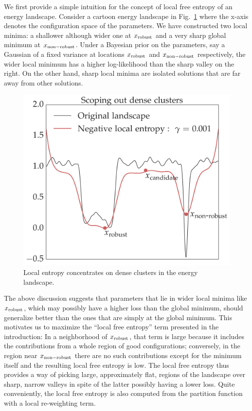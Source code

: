 \documentclass[10pt]{article}
\newcommand{\pc}[2]{{\color{ForestGreen}#1}\marginpar{\tiny\noindent{\raggedright{\color{Sienna}[PC]}\color{Sienna}{#2} \par}}}
\begin{document}
We first provide a simple intuition for the concept of local free entropy of an energy landscape. Consider a cartoon energy landscape in Fig.~\ref{fig:scoping} where the x-axis denotes the configuration space of the parameters. We have constructed two local minima: a shallower although wider one at $x_{\mathrm{robust}}$ and a very sharp global minimum at $x_{\mathrm{non-robust}}$. Under a Bayesian prior on the parameters, say a Gaussian of a fixed variance at locations $x_{\mathrm{robust}}$ and $x_{\mathrm{non-robust}}$ respectively, the wider local minimum has a higher log-likelihood than the sharp valley on the right.
\pc{On the other hand, sharp local minima are isolated solutions that are far away from other solutions.}{cite Baldassi in this section}

\begin{figure}
\centering
\includegraphics[width=0.4 \textwidth]{scoping.pdf}
\caption{\small Local entropy concentrates on dense clusters in the energy landscape.}
\label{fig:scoping}
\vspace{0.2in}
\end{figure}

The above discussion suggests that parameters that lie in wider local minima like $x_{\mathrm{robust}}$, which may possibly have a higher loss than the global minimum, should generalize better than the ones that are simply at the global minimum. This motivates us to maximize the ``local free entropy'' term presented in the introduction: In a neighborhood of $x_{\mathrm{robust}}$, that term is large because it includes the contributions from a whole region of good configurations; conversely, in the region near $x_{\mathrm{non-robust}}$ there are no such contributions except for the minimum itself and the resulting local free entropy is low. The local free entropy thus provides a way of picking large,
approximately flat, regions of the landscape over sharp, narrow valleys in spite of the latter possibly having a lower loss. Quite conveniently, the local free entropy is also computed from the partition function with a local re-weighting term.
\end{document}
